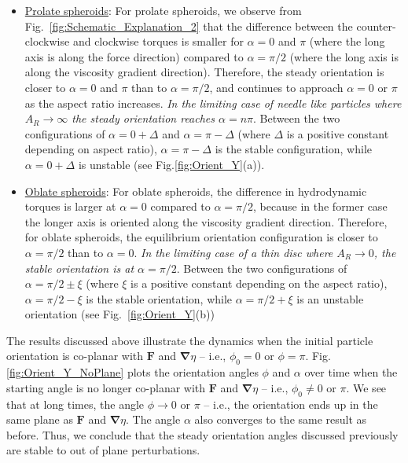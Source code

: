 \documentclass{jfm}
\begin{document}
\begin{itemize}
    \item \underline{Prolate spheroids}:  For prolate spheroids, we observe from Fig.~\ref{fig:Schematic_Explanation_2} that the difference between the counter-clockwise and clockwise torques is smaller for $\alpha =0$ and $\pi$ (where the long axis is along the force direction) compared to $\alpha =\pi/2$ (where the long axis is along the viscosity gradient direction). Therefore, the steady orientation is closer to $\alpha =0$ and $\pi$ than to  $\alpha =\pi/2$, and continues to approach $\alpha =0$ or $\pi$ as the aspect ratio increases. \textit{In the limiting case of needle like particles where $A_R \to \infty$ the steady orientation reaches $\alpha =n\pi$}. Between the two configurations of $\alpha =0+\Delta$ and $\alpha =\pi-\Delta$ (where $\Delta$ is a positive constant depending on aspect ratio), $\alpha =\pi-\Delta$ is the stable configuration, while $\alpha =0+\Delta$ is unstable (see Fig.\ref{fig:Orient_Y}(a)).

    \item \underline{Oblate spheroids}:  For oblate spheroids, the difference in hydrodynamic torques is larger at $\alpha =0$ compared to $\alpha =\pi/2$, because in the former case the longer axis is oriented along the viscosity gradient direction. Therefore, for oblate spheroids, the equilibrium orientation configuration is closer to $\alpha = \pi/2$ than to $\alpha = 0$. \textit{In the limiting case of a thin disc where $A_R \rightarrow 0$, the stable orientation is at $\alpha =\pi/2$}. Between the two configurations of $\alpha =\pi/2 \pm \xi$ (where $\xi$ is a positive constant depending on the aspect ratio), $\alpha = \pi/2 -\xi$ is the stable orientation, while $\alpha = \pi/2 +\xi$ is an unstable orientation (see Fig.~\ref{fig:Orient_Y}(b))
\end{itemize}

The results discussed above illustrate the dynamics when the initial particle orientation is co-planar with $\boldsymbol{F}$ and $\boldsymbol{\nabla} \eta$ – i.e., $\phi_0 = 0$ or $\phi = \pi$.  Fig. \ref{fig:Orient_Y_NoPlane} plots the orientation angles $\phi$ and $\alpha$ over time when the starting angle is no longer co-planar with $\boldsymbol{F}$ and $\boldsymbol{\nabla} \eta$ – i.e., $\phi_0 \neq 0$ or $\pi$.  We see that at long times, the angle $\phi \rightarrow 0$ or $\pi$ -- i.e., the orientation ends up in the same plane as $\boldsymbol{F}$ and $\boldsymbol{\nabla} \eta$.  The angle $\alpha$ also converges to the same result as before.  Thus, we conclude that the steady orientation angles discussed previously are stable to out of plane perturbations.  
\end{document}
